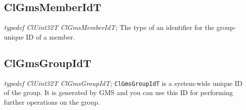 \begin{flushleft}
\subsection{ClGmsMemberIdT}
\textit{typedef ClUint32T ClGmsMemberIdT;}
\newline
\newline
The type of an identifier for the group-unique ID of a member.




\subsection{ClGmsGroupIdT}
\textit{typedef ClUint32T ClGmsGroupIdT;}
\newline
\newline
{\tt{ClGmsGroupIdT}} is a system-wide unique ID of the group. It is generated by GMS and you can use this ID for performing further operations on
the group.



\end{flushleft}
